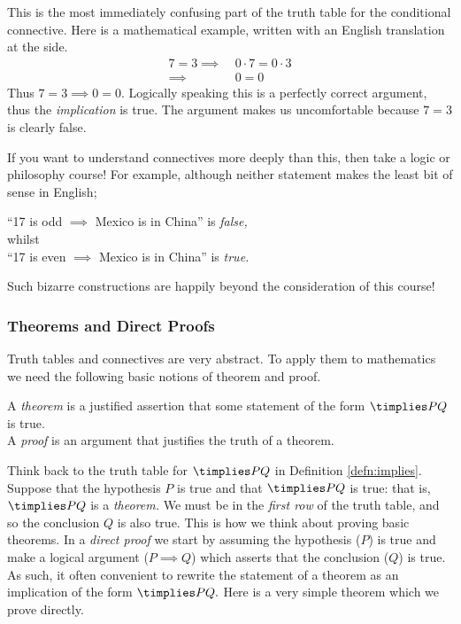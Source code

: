 \begin{aside}

This is the most immediately confusing part of the truth table for the conditional connective. Here is a mathematical example, written with an English translation at the side.
\begin{align*}
7=3\implies\ &0\cdot 7=0\cdot 3\tag*{(If $7=3$, then 0 times 7 equals 0 times 3)}\\
\implies\ &0=0\tag*{(then 0 equals 0)}
\end{align*}
Thus $7=3\implies 0=0$. Logically speaking this is a perfectly correct argument, thus the \emph{implication} is true. The argument makes us uncomfortable because $7=3$ is clearly false.

If you want to understand connectives more deeply than this, then take a logic or philosophy course! For example, although neither statement makes the least bit of sense in English;
\begin{center}
``17 is odd $\implies$ Mexico is in China'' is \emph{false,}\\ whilst\\
``17 is even $\implies$ Mexico is in China'' is \emph{true.}
\end{center}
Such bizarre constructions are happily beyond the consideration of this course!
\end{aside}


\subsubsection*{Theorems and Direct Proofs}

Truth tables and connectives are very abstract. To apply them to mathematics we need the following basic notions of theorem and proof.

\begin{defn}
A \emph{theorem} is a justified assertion that some statement of the form $\timplies PQ$ is true.\\
A \emph{proof} is an argument that justifies the truth of a theorem.
\end{defn}

\noindent Think back to the truth table for $\timplies PQ$ in Definition \ref{defn:implies}. Suppose that the hypothesis $P$ is true and that $\timplies PQ$ is true: that is, $\timplies PQ$ is a \emph{theorem.} We must be in the \emph{first row} of the truth table, and so the conclusion $Q$ is also true. This is how we think about proving basic theorems. In a \emph{direct proof} we start by assuming the hypothesis ($P$) is true and make a logical argument ($P\implies Q$) which asserts that the conclusion ($Q$) is true. As such, it often convenient to rewrite the statement of a theorem as an implication of the form $\timplies P{Q.}$ Here is a very simple theorem which we prove directly. 

